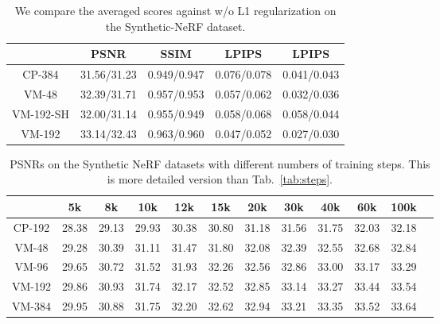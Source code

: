 \documentclass[runningheads]{llncs}
\begin{document}
\begin{table*}[htpb]
    \centering
\centering
        \renewcommand\tabcolsep{5.0pt}
        \begin{tabular}{c|cccc}
& PSNR & SSIM & LPIPS&LPIPS \\
        \hline CP-384      & 31.56/31.23 & 0.949/0.947 & 0.076/0.078 & 0.041/0.043 \\
            VM-48       & 32.39/31.71 & 0.957/0.953 & 0.057/0.062 & 0.032/0.036  \\
            VM-192-SH   & 32.00/31.14 & 0.955/0.949 & 0.058/0.068 & 0.058/0.044  \\
            VM-192      & 33.14/32.43 & 0.963/0.960 & 0.047/0.052 & 0.027/0.030  \\
        \hline
        \end{tabular}
    \caption{We compare the averaged scores against w/o L1 regularization on the Synthetic-NeRF dataset.}
    \label{tab:ab_regularization} \vspace{-2mm}
\end{table*}



\begin{table*}[htpb]
    \centering
\centering
        \renewcommand\tabcolsep{4.0pt}
        \begin{tabular}{c|ccccccccccc}
        \hline
                        & 5k & 8k & 10k & 12k & 15k & 20k & 30k & 40k & 60k & 100k \\
        \hline\hline
            CP-192 & 28.38 & 29.13 & 29.93 & 30.38 & 30.80 & 31.18 & 31.56 & 31.75 & 32.03 & 32.18 \\
            VM-48  & 29.28 & 30.39 & 31.11 & 31.47 & 31.80 & 32.08 & 32.39 & 32.55 & 32.68 & 32.84 \\
            VM-96  & 29.65 & 30.72 & 31.52 & 31.93 & 32.26 & 32.56 & 32.86 & 33.00 & 33.17 & 33.29 \\
            VM-192 & 29.86 & 30.93 & 31.74 & 32.17 & 32.52 & 32.85 & 33.14 & 33.27 & 33.44 & 33.54 \\
            VM-384 & 29.95 & 30.88 & 31.75 & 32.20 & 32.62 & 32.94 & 33.21 & 33.35 & 33.52 & 33.64 \\
        \hline
        \end{tabular}
    \caption{PSNRs on the Synthetic NeRF datasets with different numbers of training steps. This is more detailed version than Tab.~\ref{tab:steps}.}
    \label{tab:steps_more} \vspace{-4mm}
\end{table*} 
\end{document}
